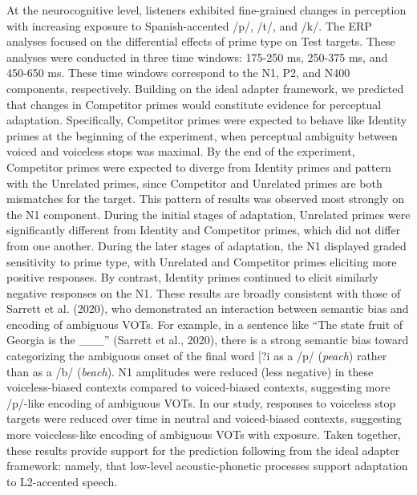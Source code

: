 \documentclass[
  12pt,
  twoside]{article}
\begin{document}
At the neurocognitive level, listeners exhibited fine-grained changes in perception with increasing exposure to Spanish-accented /p/, /t/, and /k/.
The ERP analyses focused on the differential effects of prime type on Test targets.
These analyses were conducted in three time windows: 175-250 ms, 250-375 ms, and 450-650 ms.
These time windows correspond to the N1, P2, and N400 components, respectively.
Building on the ideal adapter framework, we predicted that changes in Competitor primes would constitute evidence for perceptual adaptation.
Specifically, Competitor primes were expected to behave like Identity primes at the beginning of the experiment, when perceptual ambiguity between voiced and voiceless stops was maximal.
By the end of the experiment, Competitor primes were expected to diverge from Identity primes and pattern with the Unrelated primes, since Competitor and Unrelated primes are both mismatches for the target.
This pattern of results was observed most strongly on the N1 component.
During the initial stages of adaptation, Unrelated primes were significantly different from Identity and Competitor primes, which did not differ from one another.
During the later stages of adaptation, the N1 displayed graded sensitivity to prime type, with Unrelated and Competitor primes eliciting more positive responses.
By contrast, Identity primes continued to elicit similarly negative responses on the N1.
These results are broadly consistent with those of Sarrett et al. (2020), who demonstrated an interaction between semantic bias and encoding of ambiguous VOTs.
For example, in a sentence like ``The state fruit of Georgia is the \_\_\_'' (Sarrett et al., 2020), there is a strong semantic bias toward categorizing the ambiguous onset of the final word {[}?i\textipa{\textteshlig}{]} as a /p/ (\emph{peach}) rather than as a /b/ (\emph{beach}).
N1 amplitudes were reduced (less negative) in these voiceless-biased contexts compared to voiced-biased contexts, suggesting more /p/-like encoding of ambiguous VOTs.
In our study, responses to voiceless stop targets were reduced over time in neutral and voiced-biased contexts, suggesting more voiceless-like encoding of ambiguous VOTs with exposure.
Taken together, these results provide support for the prediction following from the ideal adapter framework: namely, that low-level acoustic-phonetic processes support adaptation to L2-accented speech.
\end{document}
